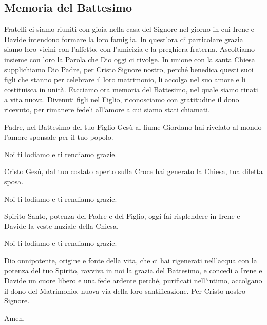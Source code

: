 
\subsection*{Memoria del Battesimo}

\begin{dialoghi}
	\item[\sacerdote] Fratelli ci siamo riuniti con gioia nella casa del Signore nel giorno in cui Irene e Davide intendono formare la loro famiglia. In quest'ora di particolare grazia siamo loro vicini con l'affetto, con l'amicizia e la preghiera fraterna. Ascoltiamo insieme con loro la Parola che Dio oggi ci rivolge. In unione con la santa Chiesa supplichiamo Dio Padre, per Cristo Signore nostro, perché benedica questi suoi figli che stanno per celebrare il loro matrimonio, li accolga nel suo amore e li costituisca in unità. Facciamo ora memoria del Battesimo, nel quale siamo rinati a vita nuova. Divenuti figli nel Figlio, riconosciamo con gratitudine il dono ricevuto, per rimanere fedeli all'amore a cui siamo stati chiamati.

	Padre, nel Battesimo del tuo Figlio Gesù al fiume Giordano hai rivelato al mondo l'amore sponsale per il tuo popolo.
	\item[\tutti] Noi ti lodiamo e ti rendiamo grazie.
	\item[\sacerdote] Cristo Gesù, dal tuo costato aperto sulla Croce hai generato la Chiesa, tua diletta sposa.
	\item[\tutti] Noi ti lodiamo e ti rendiamo grazie.
	\item[\sacerdote] Spirito Santo, potenza del Padre e del Figlio, oggi fai risplendere in Irene e Davide la veste nuziale della Chiesa.
	\item[\tutti] Noi ti lodiamo e ti rendiamo grazie.
	\item[\sacerdote] Dio onnipotente, origine e fonte della vita, che ci hai rigenerati nell'acqua con la potenza del tuo Spirito, ravviva in noi la grazia del Battesimo, e concedi a Irene e Davide un cuore libero e una fede ardente perché, purificati nell'intimo, accolgano il dono del Matrimonio, nuova via della loro santificazione. Per Cristo nostro Signore.
	\item[\tutti] Amen.
\end{dialoghi}


